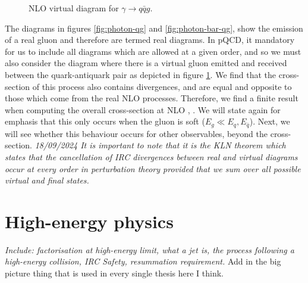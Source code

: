 \begin{figure}[h]
    \centering
    \caption{NLO virtual diagram for $\gamma\rightarrow q\bar{q}g$.}
    \label{fig:photon-qq-gluon}
\end{figure}
The diagrams in figures \ref{fig:photon-qg} and \ref{fig:photon-bar-qg}, show the emission of a real gluon and therefore are termed real diagrams. In pQCD, it mandatory for us to include all diagrams which are allowed at a given order, and so we must also consider the diagram where there is a virtual gluon emitted and received between the quark-antiquark pair as depicted in figure \ref{fig:photon-qq-gluon}. We find that the cross-section of this process also contains divergences, and are equal and opposite to those which come from the real NLO processes. Therefore, we find a finite result when computing the overall cross-section at NLO \cite{Schwartz:2014sze}, \cite{Luisoni:2015xha}. We will state again for emphasis that this only occurs when the gluon is soft ($E_g\ll E_q,E_{\bar{q}}$). Next, we will see whether this behaviour occurs for other observables, beyond the cross-section. \emph{18/09/2024 It is important to note that it is the KLN theorem which states that the cancellation of IRC divergences between real and virtual diagrams occur at every order in perturbation theory provided that we sum over all possible virtual and final states.}



\section{High-energy physics}
\emph{Include: factorisation at high-energy limit, what a jet is, the process following a high-energy collision, IRC Safety, resummation requirement.}
{\color{green} Add in the big picture thing that is used in every single thesis here I think.}
